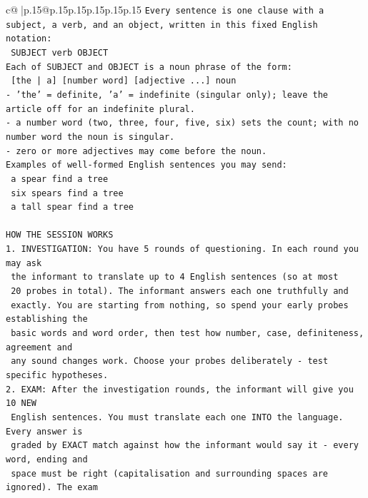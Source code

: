 \documentclass{article}
\begin{document}
{\begin{supertabular}{c@{$\;$}|p{.15\linewidth}@{}p{.15\linewidth}p{.15\linewidth}p{.15\linewidth}p{.15\linewidth}p{.15\linewidth}}
{{{\texttt{Every sentence is one clause with a subject, a verb, and an object, written in this fixed English notation:} \\
\texttt{    SUBJECT  verb  OBJECT} \\
\texttt{Each of SUBJECT and OBJECT is a noun phrase of the form:} \\
\texttt{    {[}the | a{]}  {[}number word{]}  {[}adjective ...{]}  noun} \\
\texttt{{-} 'the' = definite, 'a' = indefinite (singular only); leave the article off for an indefinite plural.} \\
\texttt{{-} a number word (two, three, four, five, six) sets the count; with no number word the noun is singular.} \\
\texttt{{-} zero or more adjectives may come before the noun.} \\
\texttt{Examples of well{-}formed English sentences you may send:} \\
\texttt{    a spear find a tree} \\
\texttt{    six spears find a tree} \\
\texttt{    a tall spear find a tree} \\
\\ 
\texttt{HOW THE SESSION WORKS} \\
\texttt{1. INVESTIGATION: You have 5 rounds of questioning. In each round you may ask} \\
\texttt{   the informant to translate up to 4 English sentences (so at most} \\
\texttt{   20 probes in total). The informant answers each one truthfully and} \\
\texttt{   exactly. You are starting from nothing, so spend your early probes establishing the} \\
\texttt{   basic words and word order, then test how number, case, definiteness, agreement and} \\
\texttt{   any sound changes work. Choose your probes deliberately {-} test specific hypotheses.} \\
\texttt{2. EXAM: After the investigation rounds, the informant will give you 10 NEW} \\
\texttt{   English sentences. You must translate each one INTO the language. Every answer is} \\
\texttt{   graded by EXACT match against how the informant would say it {-} every word, ending and} \\
\texttt{   space must be right (capitalisation and surrounding spaces are ignored). The exam} \\
}}}
\end{supertabular}}
\end{document}
